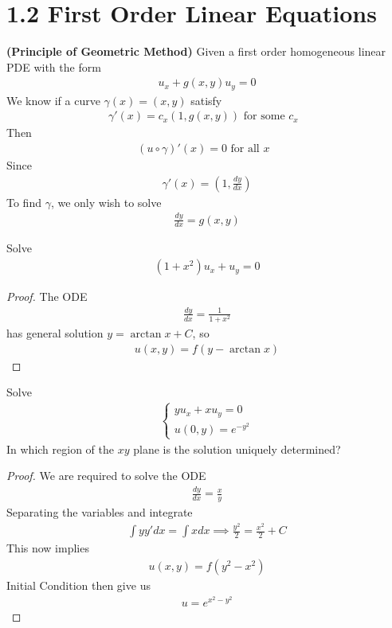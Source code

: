 \documentclass{report}
\begin{document}
\section{1.2 First Order Linear Equations}
\begin{mdframed}
\textbf{(Principle of Geometric Method)} Given a first order homogeneous linear PDE with the form  
\begin{align*}
u_x+g(x,y)u_y=0
\end{align*}
We know if a curve $\gamma (x)= (x,y)$ satisfy 
\begin{align*}
\gamma '(x)= c_x(1,g(x,y))\text{ for some $c_x$ }
\end{align*} 
Then 
\begin{align*}
  (u\circ \gamma )'(x)=0\text{ for all $x$ }
\end{align*}
Since 
\begin{align*}
\gamma '(x)=(1, \frac{dy}{dx})
\end{align*}
To find $\gamma $, we only wish to solve 
\begin{align*}
\frac{dy}{dx}=g(x,y)
\end{align*}
\end{mdframed}
\begin{question}{}{}
Solve 
\begin{align*}
  (1+x^2)u_x+u_y=0
\end{align*}
\end{question}
\begin{proof}
The ODE 
\begin{align*}
\frac{dy}{dx}=\frac{1}{1+x^2}
\end{align*}
has general solution $y=\arctan x + C$, so 
\begin{align*}
u(x,y)=f(y-\arctan x)
\end{align*}
\end{proof}
\begin{question}{}{}
Solve 
\begin{align*}
\begin{cases}
  yu_x+xu_y=0\\
  u(0,y)=e^{-y^2}
\end{cases}
\end{align*}
In which region of the $xy$ plane is the solution uniquely determined? 
\end{question}
\begin{proof}
We are required to solve the ODE 
\begin{align*}
\frac{dy}{dx}= \frac{x}{y}
\end{align*}
Separating the variables and integrate 
\begin{align*}
\int yy' dx= \int xdx  \implies \frac{y^2}{2}= \frac{x^2}{2}+C
\end{align*}
This now implies 
\begin{align*}
u(x,y)=f(y^2-x^2)
\end{align*}
Initial Condition then give us 
\begin{align*}
u=e^{x^2-y^2}
\end{align*}

\end{proof}
\end{document}
